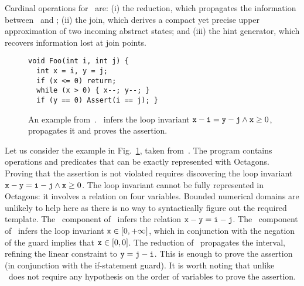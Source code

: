 \documentclass{llncs}
\begin{document}
Cardinal operations for \Subpoly\  are: (i) the reduction, which propagates the information between \LinEq\ and \Intervals;  (ii) the join, which derives a compact yet precise upper approximation of two incoming abstract states; and (iii) the hint generator, which recovers information lost at join points.

\begin{wrapfigure}{l}{0pt}
\small
\begin{minipage}{5.5cm}
\begin{Verbatim}
void Foo(int i, int j) {
  int x = i, y = j;
  if (x <= 0) return;
  while (x > 0) { x--; y--; }
  if (y == 0) Assert(i == j); }
\end{Verbatim}
\end{minipage}
\caption{\small 
An example  from~\cite{SankaranarayananEtAl07}. 
\Subpoly\ infers the loop
  invariant $\mathtt{x} - \mathtt{i} = \mathtt{y} - \mathtt{j} \wedge \mathtt{x}
  \geq 0$, propagates it and proves the assertion.}
\label{fig:ex_paperSriramNEC}
\end{wrapfigure}

Let us consider the example in Fig.~\ref{fig:ex_paperSriramNEC}, taken from~\cite{SankaranarayananEtAl07}.
The program contains operations and predicates that can be exactly represented with Octagons.
Proving that the assertion is not violated requires discovering the loop invariant $\mathtt{x} - \mathtt{y}  = \mathtt{i} - \mathtt{j} \wedge \mathtt{x} \geq 0$.
The loop invariant cannot be fully represented in Octagons: it involves a relation on four variables.
Bounded numerical domains are unlikely to help here as there is no way to syntactically figure out the required template. 
The \LinEq\ component of \SubPoly\ infers the relation $\mathtt{x} - \mathtt{y}  =  \mathtt{i} - \mathtt{j}$. 
The \Intervals\ component of \SubPoly\ infers the loop invariant $\mathtt{x} \in [0, +\infty]$, which in conjunction with the negation of the guard implies that $\mathtt{x} \in [0, 0]$.
The reduction  of \SubPoly\ propagates the interval, refining the linear constraint to $\mathtt{y} = \mathtt{j} - \mathtt{i}$.
This is enough to prove the assertion (in conjunction with the if-statement guard).
It is worth noting that unlike~\cite{SankaranarayananEtAl07} \Subpoly\ does not require any hypothesis on the order of variables to prove the assertion.
\end{document}
